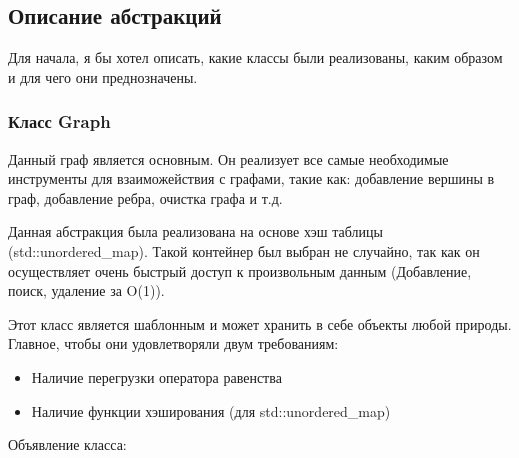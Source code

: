 \subsection{Описание абстракций}

Для начала, я бы хотел описать, какие классы были реализованы, 
каким образом и для чего они преднозначены.

\subsubsection{Класс Graph}

Данный граф является основным. Он реализует все самые необходимые инструменты для
взаиможействия с графами, такие как: добавление вершины в граф, добавление ребра, очистка графа
и т.д. 

Данная абстракция была реализована на основе хэш таблицы (std::unordered\_map). 
Такой контейнер был выбран не случайно, так как он осуществляет очень быстрый доступ 
к произвольным данным (Добавление, поиск, удаление за O(1)).

Этот класс является шаблонным и может хранить в себе объекты любой природы. Главное, чтобы
они удовлетворяли двум требованиям:

\begin{itemize}
    \item Наличие перегрузки оператора равенства 
    \item Наличие функции хэширования (для std::unordered\_map)
\end{itemize}
Объявление класса: 

